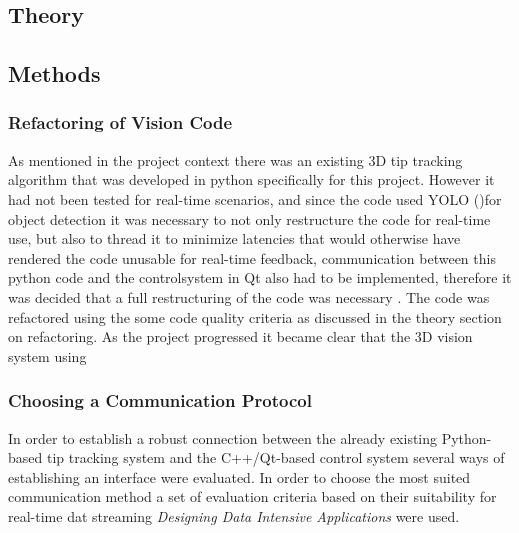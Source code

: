 
\subsection{Theory}


\subsection{Methods}

\subsubsection{Refactoring of Vision Code}
As mentioned in the project context there was an existing 3D tip tracking algorithm that was developed in python specifically for this project. However it had not been tested for real-time scenarios, and since the code used YOLO ()for object detection it was necessary to not only restructure the code for real-time use, but also to thread it to minimize latencies that would otherwise have rendered the code unusable for real-time feedback, communication between this python code and the controlsystem in Qt also had to be implemented, therefore it was decided that a full restructuring of the code was necessary
. The code was refactored using the some code quality criteria as discussed in the theory section on refactoring. 
\newline \newline
As the project progressed it became clear that the 3D vision system using 

\subsubsection{Choosing a Communication Protocol}
In order to establish a robust connection between the already existing Python-based tip tracking system and the C++/Qt-based control system several ways of establishing an interface were evaluated. In order to choose the most suited communication method a set of evaluation criteria based on their suitability for real-time dat streaming \textit{Designing Data Intensive Applications} \cite{kleppmann_designing_2017} were used.

